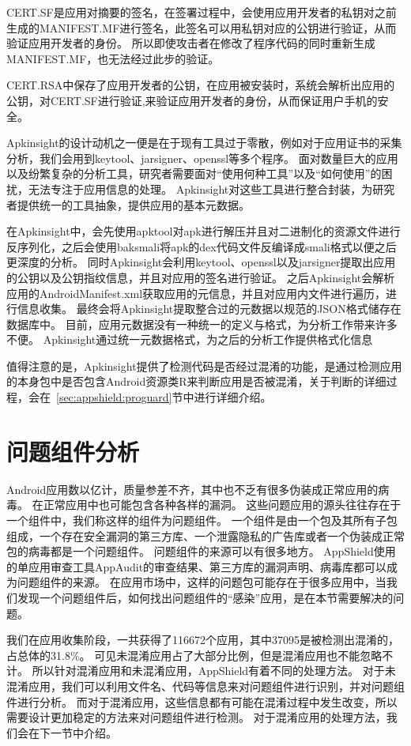 CERT.SF是应用对摘要的签名，在签署过程中，会使用应用开发者的私钥对之前生成的MANIFEST.MF进行签名，此签名可以用私钥对应的公钥进行验证，从而验证应用开发者的身份。
所以即使攻击者在修改了程序代码的同时重新生成MANIFEST.MF，也无法经过此步的验证。

CERT.RSA中保存了应用开发者的公钥，在应用被安装时，系统会解析出应用的公钥，对CERT.SF进行验证,来验证应用开发者的身份，从而保证用户手机的安全。

Apkinsight的设计动机之一便是在于现有工具过于零散，例如对于应用证书的采集分析，我们会用到keytool、jarsigner、openssl等多个程序。
面对数量巨大的应用以及纷繁复杂的分析工具，研究者需要面对“使用何种工具”以及“如何使用”的困扰，无法专注于应用信息的处理。
Apkinsight对这些工具进行整合封装，为研究者提供统一的工具抽象，提供应用的基本元数据。

在Apkinsight中，会先使用apktool对apk进行解压并且对二进制化的资源文件进行反序列化，之后会使用baksmali将apk的dex代码文件反编译成smali格式以便之后更深度的分析。
同时Apkinsight会利用keytool、openssl以及jarsigner提取出应用的公钥以及公钥指纹信息，并且对应用的签名进行验证。
之后Apkinsight会解析应用的AndroidManifest.xml获取应用的元信息，并且对应用内文件进行遍历，进行信息收集。
最终会将Apkinsight提取整合过的元数据以规范的JSON格式储存在数据库中。
目前，应用元数据没有一种统一的定义与格式，为分析工作带来许多不便。
Apkinsight通过统一元数据格式，为之后的分析工作提供格式化信息

值得注意的是，Apkinsight提供了检测代码是否经过混淆的功能，是通过检测应用的本身包中是否包含Android资源类R来判断应用是否被混淆，关于判断的详细过程，会在~\ref{sec:appshield:proguard}节中进行详细介绍。

\section{问题组件分析}
\label{sec:appshield:comp-analysis}

Android应用数以亿计，质量参差不齐，其中也不乏有很多伪装成正常应用的病毒。
在正常应用中也可能包含各种各样的漏洞。
这些问题应用的源头往往存在于一个组件中，我们称这样的组件为问题组件。
一个组件是由一个包及其所有子包组成，一个存在安全漏洞的第三方库、一个泄露隐私的广告库或者一个伪装成正常包的病毒都是一个问题组件。
问题组件的来源可以有很多地方。
AppShield使用的单应用审查工具AppAudit的审查结果、第三方库的漏洞声明、病毒库都可以成为问题组件的来源。
在应用市场中，这样的问题包可能存在于很多应用中，当我们发现一个问题组件后，如何找出问题组件的“感染”应用，是在本节需要解决的问题。

我们在应用收集阶段，一共获得了116672个应用，其中37095是被检测出混淆的，占总体的31.8\%。
可见未混淆应用占了大部分比例，但是混淆应用也不能忽略不计。
所以针对混淆应用和未混淆应用，AppShield有着不同的处理方法。
对于未混淆应用，我们可以利用文件名、代码等信息来对问题组件进行识别，并对问题组件进行分析。
而对于混淆应用，这些信息都有可能在混淆过程中发生改变，所以需要设计更加稳定的方法来对问题组件进行检测。
对于混淆应用的处理方法，我们会在下一节中介绍。


